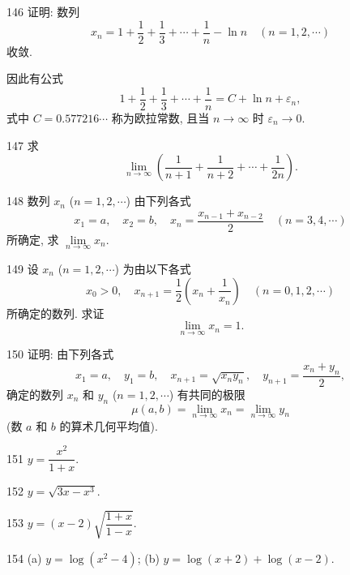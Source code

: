 \begin{prob}[M]{146}
证明: 数列
\[
x_n = 1 + \frac{1}{2} + \frac{1}{3} + \cdots + \frac{1}{n} - \ln n \quad (n = 1, 2, \cdots)
\]
收敛.

因此有公式
\[
1 + \frac{1}{2} + \frac{1}{3} + \cdots + \frac{1}{n} = C + \ln n + \varepsilon_n,
\]
式中 $C = 0.577216\cdots$ 称为欧拉常数, 且当 $n \to \infty$ 时 $\varepsilon_n \to 0$.
\end{prob}

\begin{prob}[M]{147}
求
\[
\lim_{n\to\infty} \left(\frac{1}{n+1} + \frac{1}{n+2} + \cdots + \frac{1}{2n}\right).
\]
\end{prob}

\begin{prob}[M]{148}
数列 $x_n$ ($n = 1, 2, \cdots$) 由下列各式
\[
x_1 = a, \quad x_2 = b, \quad x_n = \frac{x_{n-1} + x_{n-2}}{2} \quad (n = 3, 4, \cdots)
\]
所确定, 求 $\lim\limits_{n\to\infty} x_n$.
\end{prob}

\begin{prob}[M]{149}
设 $x_n$ ($n = 1, 2, \cdots$) 为由以下各式
\[
x_0 > 0, \quad x_{n+1} = \frac{1}{2}\left(x_n + \frac{1}{x_n}\right) \quad (n = 0, 1, 2, \cdots)
\]
所确定的数列. 求证
\[
\lim_{n\to\infty} x_n = 1.
\]
\end{prob}

\begin{prob}[M]{150}
证明: 由下列各式
\[
x_1 = a, \quad y_1 = b, \quad x_{n+1} = \sqrt{x_n y_n}, \quad y_{n+1} = \frac{x_n + y_n}{2},
\]
确定的数列 $x_n$ 和 $y_n$ ($n = 1, 2, \cdots$) 有共同的极限
\[
\mu(a, b) = \lim_{n\to\infty} x_n = \lim_{n\to\infty} y_n
\]
(数 $a$ 和 $b$ 的算术几何平均值).
\end{prob}



\begin{prob}[S]{151}
$y = \dfrac{x^2}{1 + x}$.
\end{prob}

\begin{prob}[S]{152}
$y = \sqrt{3x - x^3}$.
\end{prob}

\begin{prob}[S]{153}
$y = (x - 2)\sqrt{\dfrac{1 + x}{1 - x}}$.
\end{prob}

\begin{prob}[M]{154}
(a) $y = \log(x^2 - 4)$; \qquad (b) $y = \log(x + 2) + \log(x - 2)$.
\end{prob}

